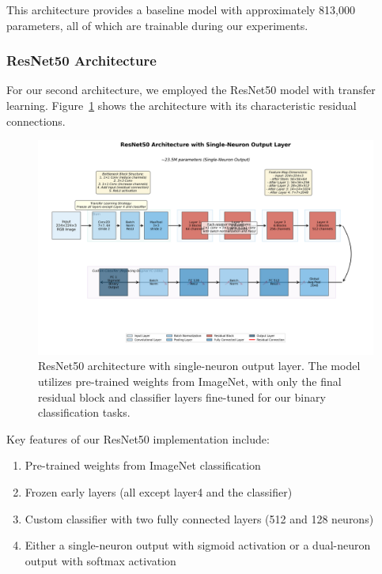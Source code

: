 This architecture provides a baseline model with approximately 813,000 parameters, all of which are trainable during our experiments.

\subsubsection{ResNet50 Architecture}

For our second architecture, we employed the ResNet50 model with transfer learning. Figure~\ref{fig:resnet50_arch} shows the architecture with its characteristic residual connections.

\begin{figure}[htbp]
\centering
\includegraphics[width=\textwidth]{figures/resnet50_1neuron_architecture.png}
\caption{ResNet50 architecture with single-neuron output layer. The model utilizes pre-trained weights from ImageNet, with only the final residual block and classifier layers fine-tuned for our binary classification tasks.}
\label{fig:resnet50_arch}
\end{figure}

Key features of our ResNet50 implementation include:
\begin{enumerate}
\item Pre-trained weights from ImageNet classification
\item Frozen early layers (all except layer4 and the classifier)
\item Custom classifier with two fully connected layers (512 and 128 neurons)
\item Either a single-neuron output with sigmoid activation or a dual-neuron output with softmax activation
\end{enumerate}


